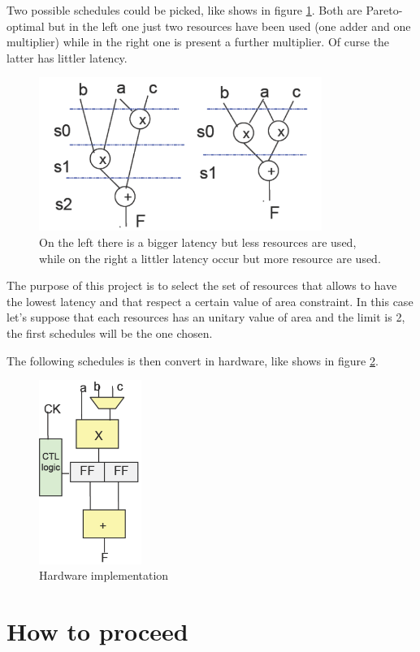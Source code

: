 Two possible schedules could be picked, like shows in figure \ref{fig:DFG_schedules}. Both are Pareto-optimal but in the left one just two resources have been used (one adder and one multiplier) while in the right one is present a further multiplier. Of curse the latter has littler latency.
 
\begin{figure}[h]
\centering
\includegraphics[height=5cm]{chapters/figures/dfg_scheduled.png}
\caption{On the left there is a bigger latency but less resources are used, while on the right a littler latency occur but more resource are used.}
\label{fig:DFG_schedules}
\end{figure}

The purpose of this project is to select the set of resources that allows to have the lowest latency and that respect a certain value of area constraint.
In this case let's suppose that each resources has an unitary value of area and the limit is 2,  the first schedules will be the one chosen.

The following schedules is then convert in hardware, like shows in figure \ref{fig:HW_schedules}.

\begin{figure}[h]
\centering
\includegraphics[height=6cm]{chapters/figures/HW_scheduling.png}
\caption{Hardware implementation}
\label{fig:HW_schedules}
\end{figure}

\section{How to proceed}

